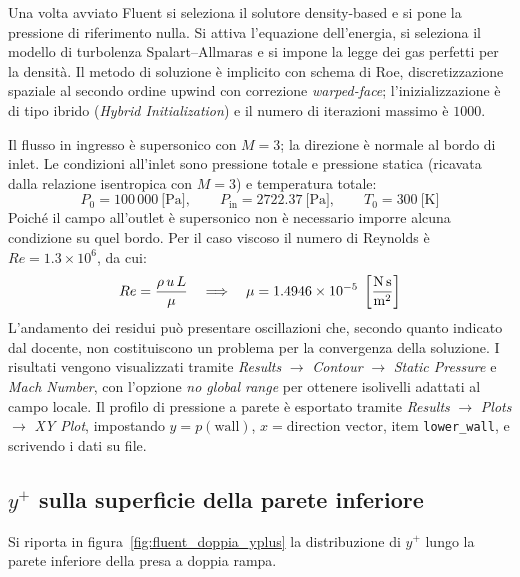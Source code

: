 Una volta avviato Fluent si seleziona il solutore density-based e si
pone la pressione di riferimento nulla.
Si attiva l'equazione dell'energia, si seleziona il modello di turbolenza
Spalart--Allmaras e si impone la legge dei gas perfetti per la densità.
Il metodo di soluzione è implicito con schema di Roe, discretizzazione
spaziale al secondo ordine upwind con correzione \textit{warped-face};
l'inizializzazione è di tipo ibrido (\textit{Hybrid Initialization}) e
il numero di iterazioni massimo è $1000$.

Il flusso in ingresso è supersonico con $M = 3$; la direzione è normale
al bordo di inlet.
Le condizioni all'inlet sono pressione totale e pressione statica
(ricavata dalla relazione isentropica con $M = 3$) e temperatura totale:
\begin{equation}
    P_0 = 100\,000\ \text{[Pa]},
    \qquad
    P_{\text{in}} = 2722.37\ \text{[Pa]},
    \qquad
    T_0 = 300\ \text{[K]}
\end{equation}
Poiché il campo all'outlet è supersonico non è necessario imporre alcuna
condizione su quel bordo.
Per il caso viscoso il numero di Reynolds è $Re = 1.3\times10^6$, da cui:
\begin{equation}
    Re = \frac{\rho\, u\, L}{\mu}
    \quad\Longrightarrow\quad
    \mu = 1.4946 \times 10^{-5}
    \;\left[\frac{\text{N\,s}}{\text{m}^2}\right]
\end{equation}
L'andamento dei residui può presentare oscillazioni che, secondo quanto
indicato dal docente, non costituiscono un problema per la convergenza
della soluzione.
I risultati vengono visualizzati tramite
\textit{Results} $\to$ \textit{Contour} $\to$ \textit{Static Pressure}
e \textit{Mach Number}, con l'opzione \textit{no global range} per
ottenere isolivelli adattati al campo locale.
Il profilo di pressione a parete è esportato tramite
\textit{Results} $\to$ \textit{Plots} $\to$ \textit{XY Plot},
impostando $y = p(\text{wall})$, $x = \text{direction vector}$,
item \texttt{lower\_wall}, e scrivendo i dati su file.

\subsection{\texorpdfstring{$y^+$ sulla superficie della parete inferiore}{y+ sulla superficie della parete inferiore}}

Si riporta in figura~\ref{fig:fluent_doppia_yplus} la distribuzione di
$y^+$ lungo la parete inferiore della presa a doppia rampa.

